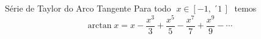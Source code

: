 \begin{frame}{Série de Taylor do Arco Tangente}
  Para todo \(\;x\in[-1,\,´1\,]\;\) temos
  \[
    \arctan x = x - \frac{x^3}{3}
                  + \frac{x^5}{5}
                  - \frac{x^7}{7}
                  + \frac{x^9}{9}
                  - \cdots
  \]
\end{frame}

\begin{frame}{\contentsname}
  \tableofcontents
\end{frame}


